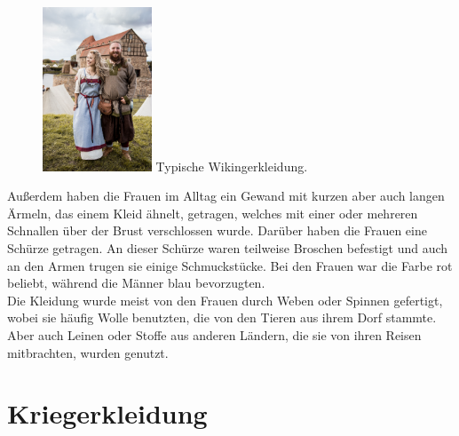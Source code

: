 \documentclass[12pt,a4paper,ngerman,openany]{book}
\begin{document}
\begin{figure}
  \centering
  \includegraphics[width=0.29\textwidth]{kleidung.jpg}
  Typische Wikingerkleidung.
\end{figure}

Außerdem haben die Frauen im Alltag ein Gewand mit kurzen aber auch langen Ärmeln, das einem Kleid ähnelt, getragen, welches mit einer oder mehreren Schnallen über der Brust verschlossen wurde. Darüber haben die Frauen eine Schürze getragen. An dieser Schürze waren teilweise Broschen befestigt und auch an den Armen trugen sie einige Schmuckstücke. Bei den Frauen war die Farbe rot beliebt, während die Männer blau bevorzugten.\\
Die Kleidung wurde meist von den Frauen durch Weben oder Spinnen gefertigt, wobei sie häufig Wolle benutzten, die von den Tieren aus ihrem Dorf stammte. Aber auch Leinen oder Stoffe aus anderen Ländern, die sie von ihren Reisen mitbrachten, wurden genutzt.

\section{Kriegerkleidung}
\end{document}
